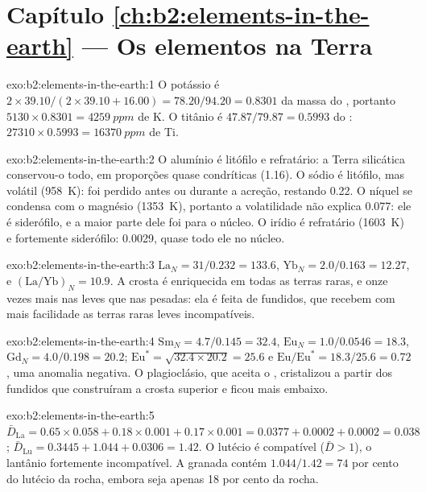 \section*{Capítulo \ref{ch:b2:elements-in-the-earth} --- Os elementos na Terra}

\begin{solution}{exo:b2:elements-in-the-earth:1}
O potássio é $2\times39.10/(2\times39.10+16.00) = 78.20/94.20 = 0.8301$ da massa do
, portanto $\num{5130}\times0.8301 = \qty{4259}{ppm}$ de K. O titânio é
$47.87/79.87 = 0.5993$ do : $\num{27310}\times0.5993 = \qty{16370}{ppm}$ de Ti.
\end{solution}

\begin{solution}{exo:b2:elements-in-the-earth:2}
O alumínio é litófilo e refratário: a Terra silicática conservou-o todo, em proporções quase
condríticas (1.16). O sódio é litófilo, mas volátil (\qty{958}{K}): foi
perdido antes ou durante a acreção, restando 0.22. O níquel se condensa com o magnésio
(\qty{1353}{K}), portanto a volatilidade não explica 0.077: ele é siderófilo, e a maior parte dele
foi para o núcleo. O irídio é refratário (\qty{1603}{K}) e fortemente siderófilo:
0.0029, quase todo ele no núcleo.
\end{solution}

\begin{solution}{exo:b2:elements-in-the-earth:3}
$\mathrm{La}_N = 31/0.232 = 133.6$, $\mathrm{Yb}_N = 2.0/0.163 = 12.27$, e
$(\mathrm{La}/\mathrm{Yb})_N = 10.9$. A crosta é enriquecida em todas as terras raras, e
onze vezes mais nas leves que nas pesadas: ela é feita de fundidos, que
recebem com mais facilidade as terras raras leves incompatíveis.
\end{solution}

\begin{solution}{exo:b2:elements-in-the-earth:4}
$\mathrm{Sm}_N = 4.7/0.145 = 32.4$, $\mathrm{Eu}_N = 1.0/0.0546 = 18.3$,
$\mathrm{Gd}_N = 4.0/0.198 = 20.2$; $\mathrm{Eu}^* = \sqrt{32.4\times20.2} = 25.6$ e
$\mathrm{Eu}/\mathrm{Eu}^* = 18.3/25.6 = 0.72$, uma anomalia negativa. O plagioclásio, que
aceita o , cristalizou a partir dos fundidos que construíram a crosta superior e ficou
mais embaixo.
\end{solution}

\begin{solution}{exo:b2:elements-in-the-earth:5}
$\bar D_{\mathrm{La}} = 0.65\times0.058+0.18\times0.001+0.17\times0.001 = 0.0377 +
0.0002 + 0.0002 = 0.038$; $\bar D_{\mathrm{Lu}} = 0.3445+1.044+0.0306 = 1.42$. O lutécio é
compatível ($\bar D > 1$), o lantânio fortemente incompatível. A granada contém
$1.044/1.42 = 74$ por cento do lutécio da rocha, embora seja apenas 18 por cento da
rocha.
\end{solution}

